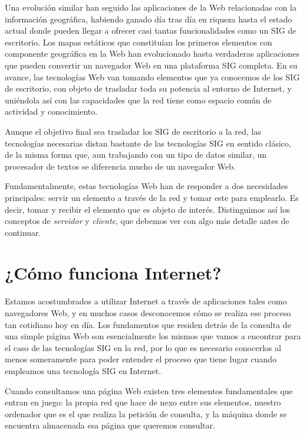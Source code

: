 Una evolución similar han seguido las aplicaciones de la Web relacionadas con la información geográfica, habiendo ganado día tras día en riqueza hasta el estado actual donde pueden llegar a ofrecer casi tantas funcionalidades como un SIG de escritorio. Los mapas estáticos que constituían los primeros elementos con componente geográfica en la Web han evolucionado hasta verdaderas aplicaciones que pueden convertir un navegador Web en una plataforma SIG completa. En su avance, las tecnologías Web van tomando elementos que ya conocemos de los SIG de escritorio, con objeto de trasladar toda su potencia al entorno de Internet, y uniéndola así con las capacidades que la red tiene como espacio común de actividad y conocimiento.

Aunque el objetivo final sea trasladar los SIG de escritorio a la red, las tecnologías necesarias distan bastante de las tecnologías SIG en sentido clásico, de la misma forma que, aun trabajando con un tipo de datos similar, un procesador de textos se diferencia mucho de un navegador Web. 

Fundamentalmente, estas tecnologías Web han de responder a dos necesidades principales: servir un elemento a través de la red y tomar este para emplearlo. Es decir, tomar y recibir el elemento que es objeto de interés. Distinguimos así los conceptos de \emph{servidor} y \emph{cliente}, que debemos ver con algo más detalle antes de continuar.

\section{¿Cómo funciona Internet?}

Estamos acostumbrados a utilizar Internet a través de aplicaciones tales como navegadores Web, y en muchos casos desconocemos cómo se realiza ese proceso tan cotidiano hoy en día. Los fundamentos que residen detrás de la consulta de una simple página Web son esencialmente los mismos que vamos a encontrar para el caso de las tecnologías SIG en la red, por lo que es necesario conocerlos al menos someramente para poder entender el proceso que tiene lugar cuando empleamos una tecnología SIG en Internet.

Cuando consultamos una página Web existen tres elementos fundamentales que entran en juego: la propia red que hace de nexo entre sus elementos, nuestro ordenador que es el que realiza la petición de consulta, y la máquina donde se encuentra almacenada esa página que queremos consultar.


